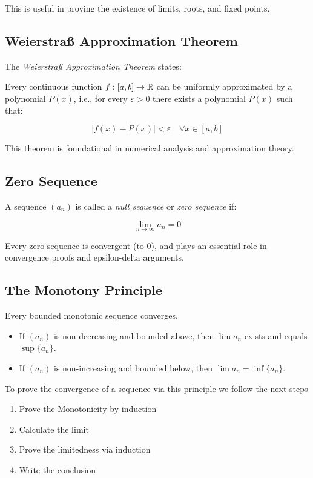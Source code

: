 This is useful in proving the existence of limits, roots, and fixed points.

\subsection{Weierstraß Approximation Theorem}

The \emph{Weierstraß Approximation Theorem} states:

Every continuous function \(f: [a, b] \rightarrow \mathbb{R}\) can be uniformly approximated by a 
polynomial \(P(x)\), i.e., for every \(\varepsilon > 0\) there exists a polynomial \(P(x)\) such that:

\[
    |f(x) - P(x)| < \varepsilon \quad \forall x \in [a, b]
\]

This theorem is foundational in numerical analysis and approximation theory.

\subsection{Zero Sequence}

A sequence \((a_n)\) is called a \emph{null sequence} or \emph{zero sequence} if:

\[
    \lim_{n \to \infty} a_n = 0
\]

Every zero sequence is convergent (to 0), and plays an essential role in convergence proofs and 
epsilon-delta arguments.

\subsection{The Monotony Principle}

Every bounded monotonic sequence converges.

\begin{itemize}

    \item If \((a_n)\) is non-decreasing and bounded above, then \(\lim a_n\) exists and equals 
    \(\sup \{a_n\}\).

    \item If \((a_n)\) is non-increasing and bounded below, then \(\lim a_n = \inf \{a_n\}\).

\end{itemize}

To prove the convergence of a sequence via this principle we follow the next steps

\begin{enumerate}

    \item Prove the Monotonicity by induction

    \item Calculate the limit

    \item Prove the limitedness via induction

    \item Write the conclusion

\end{enumerate}

